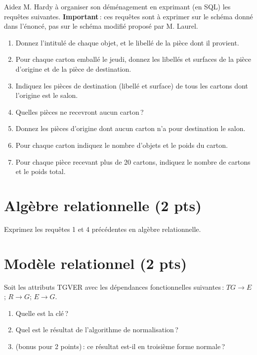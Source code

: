 Aidez M. Hardy à organiser son déménagement en
exprimant (en SQL) les requêtes suivantes. \textbf{Important}\,: ces requêtes sont à exprimer
sur le schéma donné dans l'énoncé, pas sur le schéma modifié proposé par M. Laurel.

\begin{enumerate}
  \item Donnez l'intitulé de chaque objet, et le libellé de la pièce 
    dont il provient.
    
  \item Pour chaque carton emballé le jeudi, donnez les libellés et surfaces
      de la pièce d'origine et de la pièce de destination.
  \item Indiquez les pièces de destination (libellé et surface) de tous les
  cartons dont l'origine est le salon.
  \item Quelles pièces ne recevront aucun carton\,?
  \item Donnez les pièces d'origine dont aucun carton n'a pour destination le salon.
  \item Pour chaque carton indiquez le nombre d'objets et le poids du carton.
  \item Pour chaque pièce recevant plus de 20 cartons, indiquez le
    nombre de cartons et le poids total.
  \end{enumerate}

\section{Algèbre relationnelle ({\bf 2 pts})}

Exprimez les requêtes 1 et 4 précédentes
en algèbre relationnelle.

\section{Modèle relationnel ({\bf 2 pts})}

Soit les attributs TGVER avec les dépendances fonctionnelles suivantes\,:
$TG \to E$; $R \to G$; $E \to G$.

\begin{enumerate}
  \item Quelle est la clé\,?
  \item Quel est le résultat de l'algorithme de normalisation\,?
  \item (bonus pour 2 points)\,: ce résultat est-il en troisième forme normale\,?
\end{enumerate}